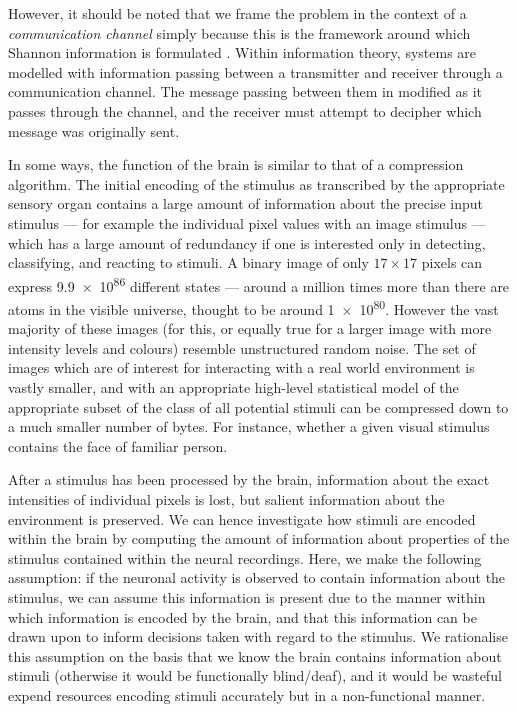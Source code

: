 However, it should be noted that we frame the problem in the context of a \textit{communication channel} simply because this is the framework around which Shannon information is formulated \citep{mackay2003information}.
Within information theory, systems are modelled with information passing between a transmitter and receiver through a communication channel.
The message passing between them in modified as it passes through the channel, and the receiver must attempt to decipher which message was originally sent.

In some ways, the function of the brain is similar to that of a compression algorithm.
The initial encoding of the stimulus as transcribed by the appropriate sensory organ contains a large amount of information about the precise input stimulus --- for example the individual pixel values with an image stimulus --- which has a large amount of redundancy if one is interested only in detecting, classifying, and reacting to stimuli.
A binary image of only $17 \times 17$ pixels can express \num{9.9e86} different states --- around a million times more than there are atoms in the visible universe, thought to be around \num{1e80}.
However the vast majority of these images (for this, or equally true for a larger image with more intensity levels and colours) resemble unstructured random noise.
The set of images which are of interest for interacting with a real world environment is vastly smaller, and with an appropriate high-level statistical model of the appropriate subset of the class of all potential stimuli can be compressed down to a much smaller number of bytes.
For instance, whether a given visual stimulus contains the face of familiar person.

After a stimulus has been processed by the brain, information about the exact intensities of individual pixels is lost, but salient information about the environment is preserved.
We can hence investigate how stimuli are encoded within the brain by computing the amount of information about properties of the stimulus contained within the neural recordings.
Here, we make the following assumption: if the neuronal activity is observed to contain information about the stimulus, we can assume this information is present due to the manner within which information is encoded by the brain, and that this information can be drawn upon to inform decisions taken with regard to the stimulus.
We rationalise this assumption on the basis that we know the brain contains information about stimuli (otherwise it would be functionally blind/deaf), and it would be wasteful expend resources encoding stimuli accurately but in a non-functional manner.

